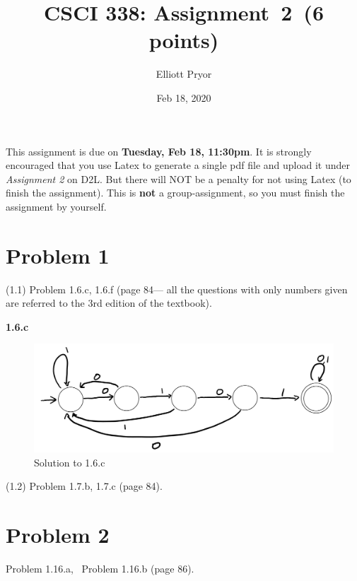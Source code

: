 \documentclass[11pt]{article}
\begin{document}
\date{Feb 18, 2020}
\title{CSCI 338: Assignment~2~(6 points)}

\author{Elliott Pryor}


\maketitle

\noindent
This assignment is due on {\bf Tuesday, Feb 18, 11:30pm}. It is strongly
encouraged that you use Latex to generate a single pdf file and upload it
under {\em Assignment 2} on D2L. But there will NOT be a penalty for not
using Latex (to finish the assignment). This is {\bf not} a group-assignment,
so you must finish the assignment by yourself.

\newpage
\section*{Problem 1}

\noindent
(1.1) Problem 1.6.c, 1.6.f (page 84---
all the questions with only numbers given are referred to the 3rd edition of the textbook).
\newline

\textbf{1.6.c}

 \begin{figure}
     \centering
     \includegraphics{1.6.c_CSCI338.PNG}
     \caption{Solution to 1.6.c}
     \label{fig:1.6.c}
 \end{figure}

\noindent
(1.2) Problem 1.7.b, 1.7.c (page 84).
\newline

\newpage
\section*{Problem 2}

Problem 1.16.a, ~Problem 1.16.b (page 86).
\newline
\end{document}
